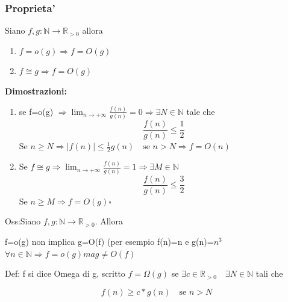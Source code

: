 \documentclass{article}
\begin{document}
        \subsubsection{Proprieta'}
        \begin{flushleft}
          Siano $f,g:\mathbb{N} \to \mathbb{R}_{>0}$ allora
        \end{flushleft}
        \begin{enumerate}
          \item $f=o(g) \Rightarrow f=O(g)$
          \item $f \cong g \Rightarrow f=O(g)$
        \end{enumerate}
        \textbf{Dimostrazioni:}
        \begin{enumerate}
          \item se f=o(g) $\Rightarrow \lim_{n \to +\infty} \frac{f(n)}{g(n)}=0 \Rightarrow \exists N \in \mathbb{N}$ tale che 
            \begin{equation*}
              \frac{f(n)}{g(n)}\leq \frac{1}{2}
            \end{equation*}
            Se $n\geq N \Rightarrow \mid f(n) \mid \leq \frac{1}{2}g(n) \quad \text{se $n>N \Rightarrow f=O(n)$}$
          \item Se $f \cong g \Rightarrow \lim_{n \to +\infty} \frac{f(n)}{g(n)}=1
            \Rightarrow \exists M \in \mathbb{N}$
            \begin{equation*}
              \frac{f(n)}{g(n)} \leq \frac{3}{2}
            \end{equation*}
            Se $ n \geq M \Rightarrow f=O(g) \square$
        \end{enumerate}
        \begin{flushleft}
          Oss:Siano $f,g: \mathbb{N} \to \mathbb{R}_{>0}$. Allora
        \end{flushleft}
        \begin{flushleft}
          f=o(g) non implica g=O(f) (per esempio f(n)=n e g(n)=$n^3$ $\forall n \in \mathbb{N} \Rightarrow f=o(g) ma g\neq O(f)$
        \end{flushleft}
        \begin{flushleft}
          Def: f si dice Omega di g, scritto $f=\Omega(g)$ se $\exists c \in \mathbb{R}_{>0} \quad \exists N \in \mathbb{N}$ tali che
        \end{flushleft}
        \begin{equation*}
          f(n) \geq c*g(n) \quad \text{se $n>N$}
        \end{equation*}
\end{document}
